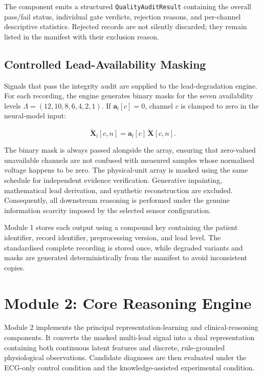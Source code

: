 \documentclass{ssnreview}
\begin{document}
The component emits a structured \texttt{QualityAuditResult} containing the overall
pass/fail status, individual gate verdicts, rejection reasons, and per-channel descriptive
statistics. Rejected records are not silently discarded; they remain listed in the manifest
with their exclusion reason.

\subsection{Controlled Lead-Availability Masking}

Signals that pass the integrity audit are supplied to the lead-degradation engine. For each
recording, the engine generates binary masks for the seven availability levels
$\Lambda=(12,10,8,6,4,2,1)$. If $\mathbf{a}_l[c]=0$, channel $c$ is clamped to zero
in the neural-model input:

\begin{equation}
  \widetilde{\mathbf{X}}_l[c,n]
  =\mathbf{a}_l[c]\,\widetilde{\mathbf{X}}[c,n].
  \label{eq:implementation-mask}
\end{equation}

The binary mask is always passed alongside the array, ensuring that zero-valued unavailable
channels are not confused with measured samples whose normalised voltage happens to be
zero. The physical-unit array is masked using the same schedule for independent evidence
verification. Generative inpainting, mathematical lead derivation, and synthetic
reconstruction are excluded. Consequently, all downstream reasoning is performed under
the genuine information scarcity imposed by the selected sensor configuration.

Module 1 stores each output using a compound key containing the patient identifier, record
identifier, preprocessing version, and lead level. The standardised complete recording is
stored once, while degraded variants and masks are generated deterministically from the
manifest to avoid inconsistent copies.

\section{Module 2: Core Reasoning Engine}

Module 2 implements the principal representation-learning and clinical-reasoning
components. It converts the masked multi-lead signal into a dual representation containing
both continuous latent features and discrete, rule-grounded physiological observations.
Candidate diagnoses are then evaluated under the ECG-only control condition and the
knowledge-assisted experimental condition.
\end{document}
